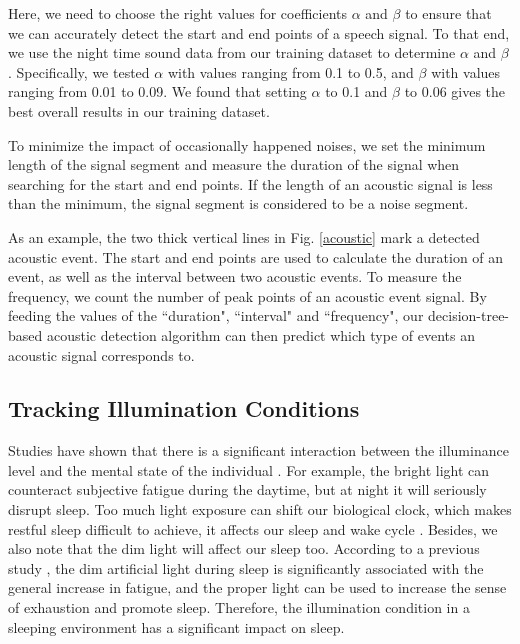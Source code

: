 Here, we need to choose the right values for coefficients $\alpha$ and $\beta$ to ensure that we can accurately detect the start and end
points of a speech signal. To that end, we use the night time sound data from our training dataset to determine $\alpha$ and $\beta$.
Specifically, we tested $\alpha$ with values ranging from 0.1 to 0.5, and $\beta$ with values ranging from 0.01 to 0.09. We found that
setting $\alpha$ to  0.1 and $\beta$ to  0.06 gives the best overall results in our training dataset.

To minimize the impact of occasionally happened noises, we set the minimum length of the signal segment and measure the duration of the
signal when searching for the start and end points. If the length of an acoustic signal is less than the minimum, the signal segment is
considered to be a noise segment.

 As an example, the two thick vertical lines in Fig. \ref{acoustic} mark a detected acoustic event. The start and end
points are used to calculate the duration of an event, as well as the interval between two acoustic events. To measure the frequency, we
count the number of peak points of an acoustic event signal. By feeding the values of the ``duration", ``interval" and ``frequency", our
decision-tree-based acoustic detection algorithm can then predict which type of events an acoustic signal corresponds to.



\subsection{Tracking Illumination Conditions \label{sec:illumination}}
Studies have shown that there is a significant interaction between the illuminance level and the mental state of the individual
\cite{light77}. For example, the bright light can counteract subjective fatigue during the daytime, but at night it will seriously disrupt
sleep. Too much light exposure can shift our biological clock, which makes restful sleep difficult to achieve, it affects our sleep and
wake cycle \cite{light2007}.  Besides, we also note that the dim light will affect our sleep too. According to a previous study
\cite{light2016}, the dim artificial light during sleep is significantly associated with the general increase in fatigue, and the proper
light can be used to increase the sense of exhaustion and promote sleep. Therefore, the illumination condition in a sleeping environment
has a significant impact on sleep.

